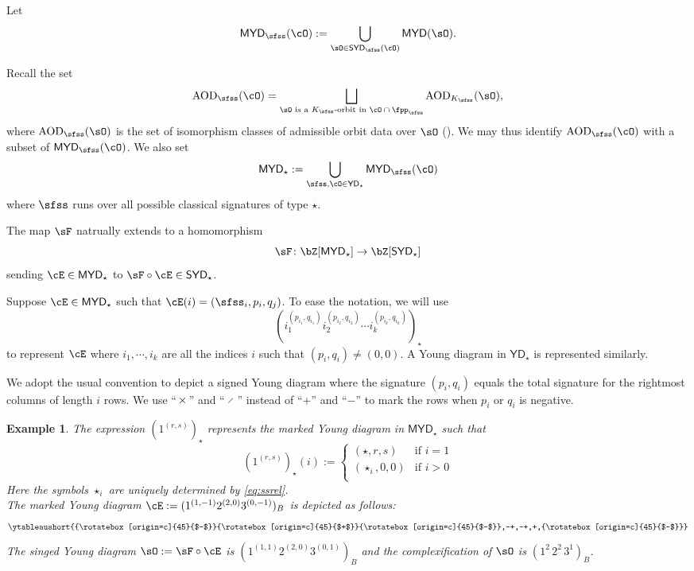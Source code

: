 \documentclass[12pt,a4paper]{amsart}
\def\YD{{\mathsf{YD}}}
\def\SYD{{\mathsf{SYD}}}
\def\MYD{{\mathsf{MYD}}}
\numberwithin{equation}{section}
\newtheorem{eg}[thm]{Example}
\theoremstyle{remark}
\let\ytb=\ytableaushort
\def\upp{{\rotatebox[origin=c]{45}{$+$}}}
\def\umm{{\rotatebox[origin=c]{45}{$-$}}}
\begin{document}

Let
\[
  \MYD_{\sfss}(\cO) := \bigcup_{\sO\in \SYD_{\sfss}(\cO)}\MYD(\sO).%
\]

Recall the set
\[
  \AOD_{\sfss}(\cO)=\bigsqcup_{\sO\textrm{ is a $\Ks$-orbit in
      $\cO\cap \fpps$}} \AOD_{\Ks}(\sO),
\]
where $\AOD_{\sfss}(\sO)$ is the set of isomorphism classes of admissible orbit
 data over $\sO$ (). We may thus identify $\AOD_{\sfss}(\cO)$ with
 a subset of $\MYD_{\sfss}(\cO)$. We also set
\[
  \MYD_\star := \bigcup_{\sfss, \cO\in \YD_\star} \MYD_{\sfss}(\cO)
\]
where $\sfss$ runs over all possible classical signatures of type $\star$.


The map $\sF$ natrually extends to a homomorphism
\begin{equation}\label{eq:F}
\sF\colon \bZ[\MYD_\star] \rightarrow \bZ[\SYD_\star]
\end{equation}
sending $\cE\in \MYD_\star$ to $\sF\circ \cE \in \SYD_\star$.

\smallskip

Suppose $\cE\in \MYD_{\star}$ such that $\cE(i)=(\sfss_{i},p_{i},q_{j})$.
To ease the notation, we will use
\[
  ( i_{1}^{(p_{i_{1}},q_{i_{1}})}i_{2}^{(p_{i_{2}},q_{i_{2}})}\cdots i_{k}^{(p_{i_{k}},q_{i_{k}})} )_{\star}
\]
to represent $\cE$ where
$i_{1},\cdots, i_{k}$ are all the indices $i$ such that $(p_{i},q_{i})\neq (0,0)$.
A Young diagram in $\YD_{\star}$ is represented similarly.

We adopt the usual convention to depict a signed Young diagram where the signature
$(p_{i}, q_{i})$ equals the total signature for the rightmost columns of
length $i$ rows.
We use ``$\upp$'' and ``$\umm$'' instead of ``$+$'' and ``$-$'' to mark the rows
when $p_{i}$ or $q_{i}$ is negative.

\begin{eg}\label{eg:MYD}
The expression $(1^{(r,s)})_{\star}$ represents the marked Young diagram in $\MYD_{\star}$ such that
 \[
   (1^{(r,s)})_{\star}(i) := \begin{cases}
     (\star,r,s) & \text{if } i=1\\
     (\star_{i},0,0) & \text{if $i>0$}\\
   \end{cases}
 \]
 Here the symbols $\star_{i}$ are uniquely determined by \eqref{eq:ssrel}.\\
The marked Young diagram  $\cE:=(1^{(1,-1)}2^{(2,0)}3^{(0,-1)})_{B}$ is depicted as follows:
\[
  \ytb{\umm\upp\umm,-+,-+,+,\umm}
\]
The singed Young diagram $\sO:=\sF\circ \cE$ is
$(1^{(1,1)}2^{(2,0)}3^{(0,1)})_{B}$ and the complexification of $\sO$
is $(1^{2}\,2^{2}\,3^{1})_{B}$.
\end{eg}
\end{document}
